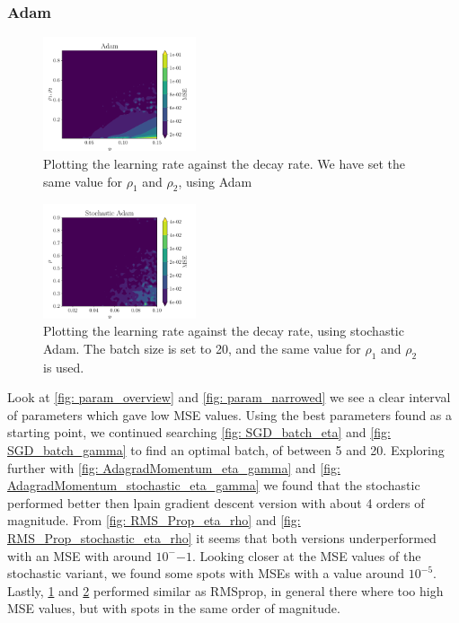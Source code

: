 \documentclass[aps,pra,english,notitlepage,reprint,nofootinbib]{revtex4-1}  %
\begin{document}
\subsubsection{Adam}
\begin{figure}[ht!]
    \centering
    \includegraphics[width = 0.4\textwidth]{../figs/Adam_eta_rho.pdf}
    \caption{Plotting the learning rate against the decay rate. We have set the same value for $\rho_1$ and $\rho_2$, using Adam}
    \label{fig: Adam_eta_rho.pdf}
\end{figure}

\begin{figure}[ht!]
    \centering
    \includegraphics[width = 0.4\textwidth]{../figs/Adam_stochastic_eta_rho.pdf}
    \caption{Plotting the learning rate against the decay rate, using stochastic Adam. The batch size is set to 20, and the same value for $\rho_1$ and $\rho_2$ is used.}
    \label{fig: Adam_stochastic_eta_rho.pdf}
\end{figure}
  
Look at \cref{fig: param_overview} and \cref{fig: param_narrowed} we see a clear interval of parameters which gave low MSE values. Using the best parameters found as a starting point, we continued searching \cref{fig: SGD_batch_eta} and \cref{fig: SGD_batch_gamma} to find an optimal batch, of between 5 and 20. Exploring further with \cref{fig: AdagradMomentum_eta_gamma} and \cref{fig: AdagradMomentum_stochastic_eta_gamma} we found that the stochastic performed better then lpain gradient descent version with about 4 orders of magnitude. From \cref{fig: RMS_Prop_eta_rho} and \cref{fig: RMS_Prop_stochastic_eta_rho} it seems that both versions underperformed with an MSE with around \( 10^-{-1} \). Looking closer at the MSE values of the stochastic variant, we found some spots with MSEs with a value around \( 10^{-5} \). Lastly, \cref{fig: Adam_eta_rho.pdf} and \cref{fig: Adam_stochastic_eta_rho.pdf} performed similar as RMSprop, in general there where too high MSE values, but with spots in the same order of magnitude.
\end{document}
